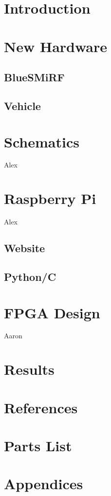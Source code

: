 \documentclass[12pt]{article}
\begin{document}
\newpage


\section{Introduction}
\section{New Hardware}
\subsection{BlueSMiRF}
\subsection{Vehicle}
\section{Schematics}
Alex
\section{Raspberry Pi}
Alex
\subsection{Website}
\subsection{Python/C}
\section{FPGA Design}
Aaron
\section{Results}
\section{References}
\section{Parts List}
\section{Appendices}


%
%
%
%
\vfill
\end{document}
